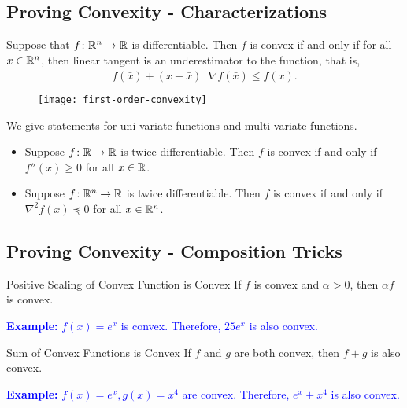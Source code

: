 \documentclass[../open-optimization/open-optimization.tex]{subfiles}
\begin{document}
\subsection{Proving Convexity - Characterizations}

\begin{theorem}
Suppose that $f\colon {\mathbb{R}}^n \to {\mathbb{R}}$ is differentiable.  Then $f$ is convex if and only if for all $\bar x \in {\mathbb{R}}^n$, then linear tangent is an underestimator to the function, that is,
$$
f(\bar x) + (x - \bar x)^\top \nabla f(\bar x) \leq f(x).
$$
\end{theorem}

\begin{figure}[H]
\begin{center}
\texttt{[image: first-order-convexity]}\footnotemark
\end{center}
\end{figure}



\begin{theorem}
We give statements for uni-variate functions and multi-variate functions.
\begin{itemize}
\item Suppose $f \colon {\mathbb{R}} \to {\mathbb{R}}$ is twice differentiable.  Then $f$ is convex if and only if $f''(x) \geq 0$ for all $x \in {\mathbb{R}}$.
\item Suppose $f \colon {\mathbb{R}}^n \to {\mathbb{R}}$ is twice differentiable.  Then $f$ is convex if and only if $\nabla^2 f(x) \preceq 0$ for all $x \in {\mathbb{R}}^n$.
\end{itemize}
\end{theorem}


\subsection{Proving Convexity - Composition Tricks}


\begin{general}{Positive Scaling of Convex Function is Convex}{}
If $f$ is convex and $\alpha > 0$, then $\alpha f$ is convex. 

\textcolor{blue}{\textbf{Example: } $f(x) = e^x$ is convex.  Therefore, $25 e^x$ is also convex.}
\end{general}

\begin{general}{Sum of Convex Functions is Convex}{}
If $f$ and $g$ are both convex, then $f+g$ is also convex.

\textcolor{blue}{\textbf{Example: } $f(x) = e^x, g(x) = x^4$ are convex.  Therefore, $e^x + x^4$ is also convex.}
\end{general}
\end{document}
